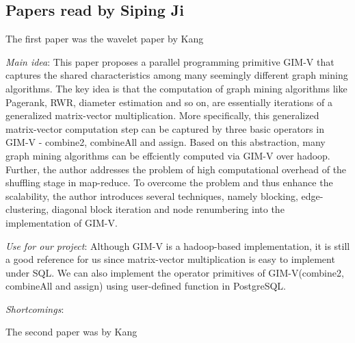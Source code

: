 \subsection{Papers read by Siping Ji}
The first paper was the wavelet paper by Kang
\cite{Kang09}
\begin{itemize*}
\item {\em Main idea}: 
		This paper proposes a parallel programming primitive GIM-V that captures the shared characteristics among many seemingly different graph mining algorithms. The key idea is that the computation of graph mining algorithms like Pagerank, RWR, diameter estimation and so on, are essentially iterations of a generalized matrix-vector multiplication. More specifically, this generalized matrix-vector computation step can be captured by three basic operators in GIM-V - combine2, combineAll and assign. Based on this abstraction, many graph mining algorithms can be effciently computed via GIM-V over hadoop. Further, the author addresses the problem of high computational overhead of the shuffling stage in map-reduce. To overcome the problem and thus enhance the scalability, the author introduces several techniques, namely blocking, edge-clustering, diagonal block iteration and node renumbering into the implementation of GIM-V.
\item {\em Use for our project}:
      Although GIM-V is a hadoop-based implementation, it is still a good reference for us since matrix-vector multiplication is easy to implement under SQL.  We can also implement the operator primitives of GIM-V(combine2, combineAll and assign) using user-defined function in PostgreSQL.

\item {\em Shortcomings}:
      
\end{itemize*}
The second paper was by Kang
\cite{DBLP:conf/icdm/KangMAF10}
